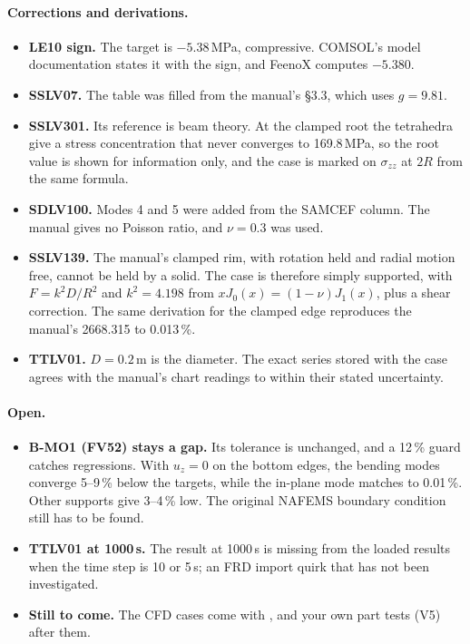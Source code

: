 \paragraph{Corrections and derivations.}
\begin{itemize}[nosep]
  \item \textbf{LE10 sign.} The target is $-5.38$\,MPa, compressive. COMSOL's model documentation states it with
        the sign, and FeenoX computes $-5.380$.
  \item \textbf{SSLV07.} The table was filled from the manual's \S3.3, which uses $g=9.81$.
  \item \textbf{SSLV301.} Its reference is beam theory. At the clamped root the tetrahedra give a stress
        concentration that never converges to 169.8\,MPa, so the root value is shown for information only,
        and the case is marked on $\sigma_{zz}$ at $2R$ from the same formula.
  \item \textbf{SDLV100.} Modes 4 and 5 were added from the SAMCEF column. The manual gives no Poisson ratio,
        and $\nu=0.3$ was used.
  \item \textbf{SSLV139.} The manual's clamped rim, with rotation held and radial motion free, cannot be held by
        a solid. The case is therefore simply supported, with $F=k^2D/R^2$ and $k^2=4.198$ from
        $xJ_0(x)=(1-\nu)J_1(x)$, plus a shear correction. The same derivation for the clamped edge reproduces the
        manual's 2668.315 to 0.013\,\%.
  \item \textbf{TTLV01.} $D=0.2$\,m is the diameter. The exact series stored with the case agrees with the
        manual's chart readings to within their stated uncertainty.
\end{itemize}

\paragraph{Open.}
\begin{itemize}[nosep]
  \item \textbf{B-MO1 (FV52) stays a gap.} Its tolerance is unchanged, and a 12\,\% guard catches regressions. With
        $u_z=0$ on the bottom edges, the bending modes converge 5--9\,\% below the targets, while the in-plane
        mode matches to 0.01\,\%. Other supports give 3--4\,\% low. The original NAFEMS boundary condition still
        has to be found.
  \item \textbf{TTLV01 at 1000\,s.} The result at 1000\,s is missing from the loaded results when the time step
        is 10 or 5\,s; an FRD import quirk that has not been investigated.
  \item \textbf{Still to come.} The CFD cases come with , and your own part tests (V5) after them.
\end{itemize}
